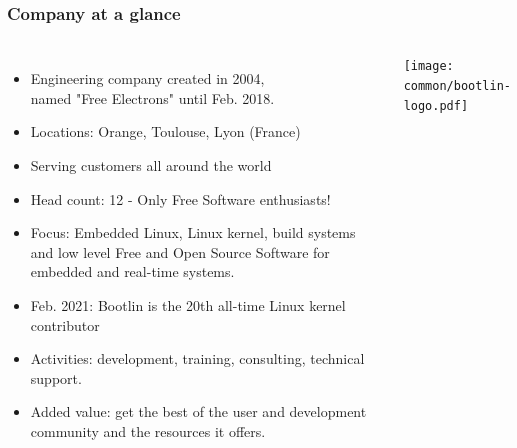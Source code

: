 \begin{frame}
\frametitle{Company at a glance}
  \begin{columns}
  \small
  \begin{itemize}
    \item Engineering company created in 2004,\\
	  named "Free Electrons" until Feb. 2018.
    \item Locations: Orange, Toulouse, Lyon (France)
    \item Serving customers all around the world
    \item Head count: 12 - Only Free Software enthusiasts!
    \item Focus: Embedded Linux, Linux kernel,
          build systems and low level Free and Open Source Software
          for embedded and real-time systems.
    \item Feb. 2021: Bootlin is the 20th all-time Linux kernel contributor
    \item Activities: development, training, consulting, technical
          support.
    \item Added value: get the best of the user and development
          community and the resources it offers.
  \end{itemize}
  \texttt{[image: common/bootlin-logo.pdf]}\\
  \vspace{0.25cm}

\end{columns}
\end{frame}
